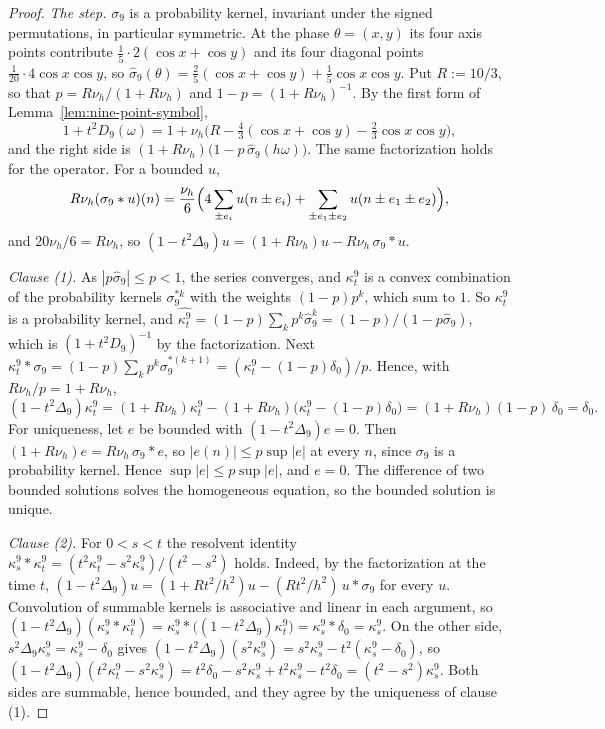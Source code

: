 \begin{proof}
\leanok
\emph{The step.} $\sigma_9$ is a probability kernel, invariant under the signed permutations, in
particular symmetric. At the phase $\theta = (x, y)$ its four axis points contribute
$\tfrac15\cdot2(\cos x + \cos y)$ and its four diagonal points $\tfrac1{20}\cdot4\cos x\cos y$, so
$\widehat\sigma_9(\theta) = \tfrac25(\cos x + \cos y) + \tfrac15\cos x\cos y$. Put $R := 10/3$, so that
$p = R\nu_h/(1 + R\nu_h)$ and $1 - p = (1 + R\nu_h)^{-1}$. By the first form of
Lemma~\ref{lem:nine-point-symbol},
\[
  1 + t^2D_9(\omega) = 1 + \nu_h\bigl(R - \tfrac43(\cos x + \cos y) - \tfrac23\cos x\cos y\bigr) ,
\]
and the right side is $(1 + R\nu_h)\bigl(1 - p\,\widehat\sigma_9(h\omega)\bigr)$. The same
factorization holds for the operator. For a bounded $u$,
\[
  R\nu_h(\sigma_9 * u)(n) = \frac{\nu_h}{6}\Bigl(4\sum_{\pm e_i}u(n \pm e_i)
  + \sum_{\pm e_1 \pm e_2}u(n \pm e_1 \pm e_2)\Bigr) ,
\]
and $20\nu_h/6 = R\nu_h$, so $(1 - t^2\Delta_9)u = (1 + R\nu_h)u - R\nu_h\,\sigma_9 * u$.

\emph{Clause (1).} As $|p\widehat\sigma_9| \le p < 1$, the series converges, and $\kappa^9_t$ is a convex
combination of the probability kernels $\sigma_9^{*k}$ with the weights $(1-p)p^k$, which sum to $1$.
So $\kappa^9_t$ is a probability kernel, and
$\widehat{\kappa^9_t} = (1-p)\sum_kp^k\widehat\sigma_9^k = (1-p)/(1 - p\widehat\sigma_9)$, which is
$(1 + t^2D_9)^{-1}$ by the factorization. Next
$\kappa^9_t * \sigma_9 = (1-p)\sum_kp^k\sigma_9^{*(k+1)} = (\kappa^9_t - (1-p)\delta_0)/p$. Hence, with
$R\nu_h/p = 1 + R\nu_h$,
\[
  (1 - t^2\Delta_9)\kappa^9_t = (1 + R\nu_h)\kappa^9_t - (1 + R\nu_h)\bigl(\kappa^9_t - (1-p)\delta_0\bigr)
  = (1 + R\nu_h)(1-p)\,\delta_0 = \delta_0 .
\]
For uniqueness, let $e$ be bounded with $(1 - t^2\Delta_9)e = 0$. Then
$(1 + R\nu_h)e = R\nu_h\,\sigma_9 * e$, so $|e(n)| \le p\sup|e|$ at every $n$, since $\sigma_9$ is a
probability kernel. Hence $\sup|e| \le p\sup|e|$, and $e = 0$. The difference of two bounded
solutions solves the homogeneous equation, so the bounded solution is unique.

\emph{Clause (2).} For $0 < s < t$ the resolvent identity
$\kappa^9_s * \kappa^9_t = (t^2\kappa^9_t - s^2\kappa^9_s)/(t^2 - s^2)$ holds. Indeed, by the
factorization at the time $t$, $(1 - t^2\Delta_9)u = (1 + Rt^2/h^2)u - (Rt^2/h^2)\,u * \sigma_9$ for
every $u$. Convolution of summable kernels is associative and linear in each argument, so
$(1 - t^2\Delta_9)(\kappa^9_s * \kappa^9_t) = \kappa^9_s * \bigl((1 - t^2\Delta_9)\kappa^9_t\bigr) =
\kappa^9_s * \delta_0 = \kappa^9_s$. On the other
side, $s^2\Delta_9\kappa^9_s = \kappa^9_s - \delta_0$ gives
$(1 - t^2\Delta_9)(s^2\kappa^9_s) = s^2\kappa^9_s - t^2(\kappa^9_s - \delta_0)$, so
$(1 - t^2\Delta_9)(t^2\kappa^9_t - s^2\kappa^9_s) = t^2\delta_0 - s^2\kappa^9_s + t^2\kappa^9_s - t^2\delta_0 =
(t^2 - s^2)\kappa^9_s$. Both sides are summable, hence bounded, and they agree by the uniqueness of
clause (1).


\end{proof}

